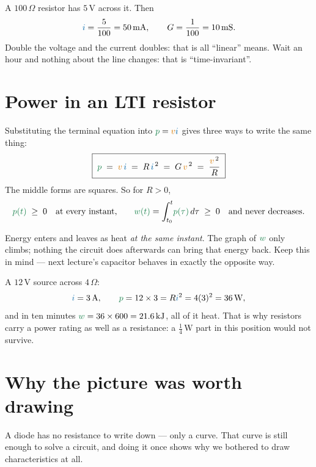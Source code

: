 \documentclass[11pt,a4paper]{article}
\newcommand{\Icol}[1]{\textcolor{ccur}{#1}}
\newcommand{\Vcol}[1]{\textcolor{cvolt}{#1}}
\newcommand{\Pcol}[1]{\textcolor{cpow}{#1}}
\newcommand{\uni}[1]{\,\mathrm{#1}}
\newcommand{\A}{\uni{A}}   \newcommand{\V}{\uni{V}}
\newcommand{\W}{\uni{W}}   \newcommand{\J}{\uni{J}}
\newcommand{\ohm}{\,\Omega}
\begin{document}
\begin{examplebox}
A $100\ohm$ resistor has $5\V$ across it. Then
\[
  \Icol{i} = \frac{5}{100} = 50\uni{mA} ,
  \qquad
  G = \frac{1}{100} = 10\uni{mS} .
\]
Double the voltage and the current doubles: that is all ``linear'' means. Wait an hour and
nothing about the line changes: that is ``time-invariant''.
\end{examplebox}

\section{Power in an LTI resistor}

Substituting the terminal equation into $\Pcol{p} = \Vcol{v}\Icol{i}$ gives three ways to
write the same thing:
\[
  \boxed{\;\Pcol{p} \;=\; \Vcol{v}\,\Icol{i} \;=\; R\,\Icol{i}^{\,2}
         \;=\; G\,\Vcol{v}^{\,2} \;=\; \frac{\Vcol{v}^{\,2}}{R}\;}
\]
The middle forms are squares. So for $R > 0$,
\[
  \Pcol{p(t)} \;\ge\; 0 \quad\text{at every instant,}
  \qquad
  \Pcol{w(t)} = \int_{t_0}^{t}\!\Pcol{p(\tau)}\,d\tau \;\ge\; 0
  \quad\text{and never decreases.}
\]

\begin{ideabox}
Energy enters and leaves as heat \emph{at the same instant}. The graph of $\Pcol{w}$ only
climbs; nothing the circuit does afterwards can bring that energy back. Keep this in mind ---
next lecture's capacitor behaves in exactly the opposite way.
\end{ideabox}

\begin{examplebox}
A $12\V$ source across $4\ohm$:
\[
  \Icol{i} = 3\A, \qquad
  \Pcol{p} = 12 \times 3 = R\Icol{i}^2 = 4(3)^2 = 36\W ,
\]
and in ten minutes $\Pcol{w} = 36 \times 600 = 21.6\uni{kJ}$, all of it heat. That is why
resistors carry a power rating as well as a resistance: a $\tfrac14\W$ part in this
position would not survive.
\end{examplebox}

\section{Why the picture was worth drawing}
\label{sec:loadline}

A diode has no resistance to write down --- only a curve. That curve is still enough
to solve a circuit, and doing it once shows why we bothered to draw characteristics
at all.
\end{document}
